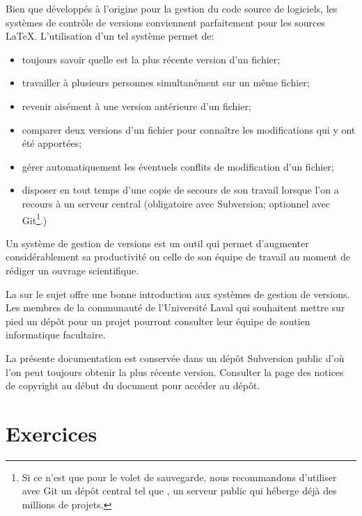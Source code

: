 Bien que développés à l'origine pour la gestion du code source de
logiciels, les systèmes de contrôle de versions conviennent
parfaitement pour les sources {\LaTeX}. L'utilisation d'un tel système
permet de:
\begin{itemize}
\item toujours savoir quelle est la plus récente version d'un fichier;
\item travailler à plusieurs personnes simultanément sur un même
  fichier;
\item revenir aisément à une version antérieure d'un fichier;
\item comparer deux versions d'un fichier pour connaître les
  modifications qui y ont été apportées;
\item gérer automatiquement les éventuels conflits de modification
  d'un fichier;
\item disposer en tout temps d'une copie de secours de son travail
  lorsque l'on a recours à un serveur central (obligatoire avec
  Subversion; optionnel avec Git\footnote{%
    Si ce n'est que pour le volet de sauvegarde, nous recommandons
    d'utiliser avec Git un dépôt central tel que
    , un serveur public qui héberge
    déjà des millions de projets.}.)
\end{itemize}
Un système de gestion de versions est un outil qui permet d'augmenter
considérablement sa productivité ou celle de son équipe de
travail au moment de rédiger un ouvrage scientifique.

La %
sur le sujet offre une bonne introduction aux systèmes de gestion de
versions. Les membres de la communauté de l'Université Laval qui
souhaitent mettre sur pied un dépôt pour un projet pourront
consulter leur équipe de soutien informatique facultaire.

\begin{information}
  La présente documentation est conservée dans un dépôt Subversion
  public d'où l'on peut toujours obtenir la plus récente version.
  Consulter la page des notices de copyright au début du document pour
  accéder au dépôt.
\end{information}




\section{Exercices}
\label{sec:trucs:exercices}

